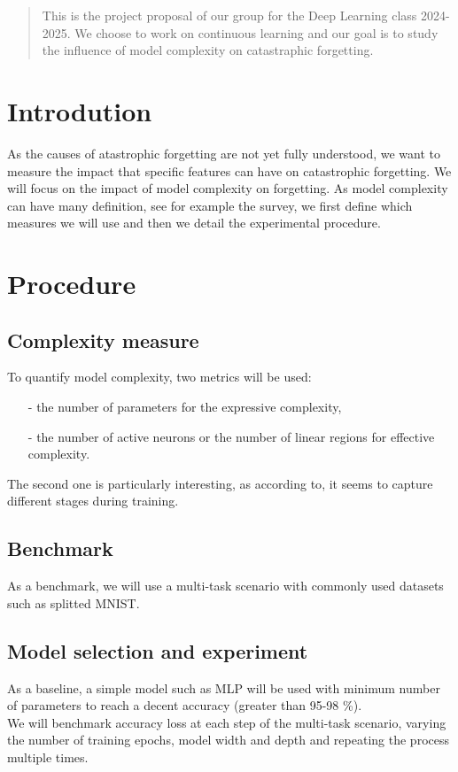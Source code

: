 \documentclass{article}
\theoremstyle{plain}
\theoremstyle{definition}
\theoremstyle{remark}
\begin{document}
\begin{abstract}
    This is the project proposal of our group for the Deep Learning class 2024-2025. We choose to work on continuous learning and our goal is to study the influence of model complexity on catastraphic forgetting.
\end{abstract}



\section{Introdution}
As the causes of atastrophic forgetting\cite{catastrophic_forgetting} are not yet fully understood, we want to measure the impact that specific features can have on catastrophic forgetting. We will focus on the impact of model complexity on forgetting. As model complexity can have many definition, see for example the survey\cite{dl_model_complexity_survey}, we first define which measures we will use and then we detail the experimental procedure.

\section{Procedure}
\subsection{Complexity measure}
To quantify model complexity, two metrics will be used: 
\begin{itemize}
	\item[-] the number of parameters for the expressive complexity,
	\item[-] the number of active neurons or the number of linear regions for effective complexity.
\end{itemize}
The second one is particularly interesting, as according to\cite{hanin2019complexitylinearregionsdeep}, it seems to capture different stages during training.
\subsection{Benchmark}
As a benchmark, we will use a multi-task scenario with commonly used datasets such as splitted MNIST.

\subsection{Model selection and experiment}
As a baseline, a simple model such as MLP will be used with minimum number of parameters to reach a decent accuracy (greater than 95-98 \%). \\
We will benchmark accuracy loss at each step of the multi-task scenario, varying the number of training epochs, model width and depth and repeating the process multiple times.
\end{document}
